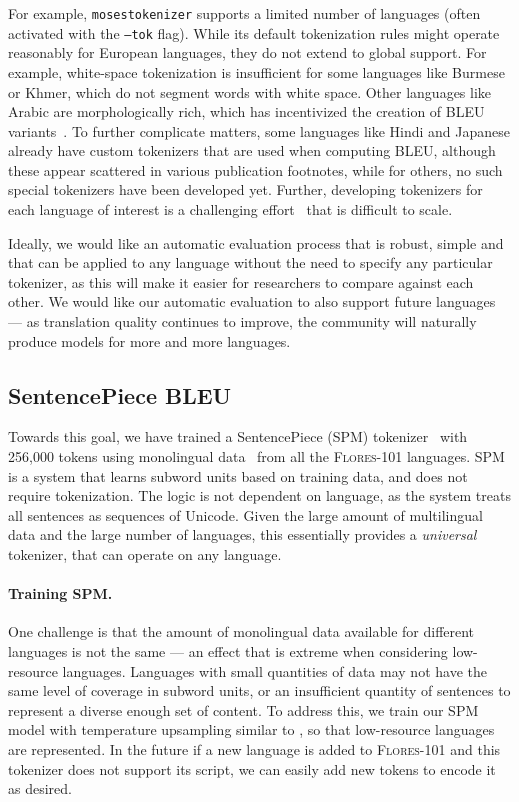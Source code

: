 For example, \texttt{mosestokenizer} supports a limited number of languages (often activated with the \texttt{--tok} flag). While its default tokenization rules might operate reasonably for European languages, they do not extend to global support. For example, white-space tokenization is insufficient for some languages like Burmese or Khmer, which do not segment words with white space. Other languages like Arabic are morphologically rich, which has incentivized the creation of BLEU variants~\cite{bouamor-etal-2014-human}. To further complicate matters, some languages like Hindi and Japanese already have custom tokenizers that are used when computing BLEU, although these appear scattered in various publication footnotes, while for others, no such special tokenizers have been developed yet. Further, developing tokenizers for each language of interest is a challenging effort~\cite{dossou2021crowdsourced,li2021finding} that is difficult to scale.

Ideally, we would like an automatic evaluation process that is robust, simple and that can be applied to any language without the need to specify any particular tokenizer, as this will make it easier for researchers to compare against each other. We would like our automatic evaluation to also support future languages --- as translation quality continues to improve, the community will naturally produce models for more and more languages. 

\subsection{SentencePiece BLEU} 

Towards this goal, we have trained a SentencePiece (SPM) tokenizer~\citep{kudo2018sentencepiece} with 256,000 tokens using monolingual data~\citep{conneau2020unsupervised, wenzek2019ccnet} from all the \textsc{Flores-101} languages. SPM is a system that learns subword units based on training data, and does not require tokenization. The logic is not dependent on language, as the system treats all sentences as sequences of Unicode. Given the large amount of multilingual data and the large number of languages, this essentially provides a \textit{universal} tokenizer, that can operate on any language. 

\paragraph{Training SPM.} One challenge is that the amount of monolingual data available for different languages is not the same --- an effect that is extreme when considering low-resource languages. Languages with small quantities of data may not have the same level of coverage in subword units, or an insufficient quantity of sentences to represent a diverse enough set of content. To address this, we train our SPM model with temperature upsampling similar to \cite{conneau2020unsupervised}, so that low-resource languages are represented. In the future if a new language is added to \textsc{Flores-101} and this tokenizer does not support its script, we can easily add new tokens to encode it as desired.

